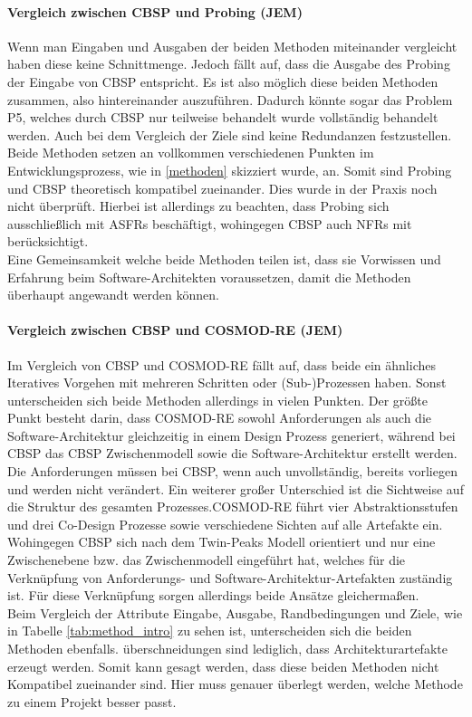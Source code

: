\paragraph{Vergleich zwischen CBSP und Probing (JEM)}
Wenn man Eingaben und Ausgaben der beiden Methoden miteinander vergleicht haben diese keine Schnittmenge. Jedoch f\"allt auf, dass die Ausgabe des Probing der Eingabe von CBSP entspricht. Es ist also m\"oglich diese beiden Methoden zusammen, also hintereinander auszuf\"uhren. Dadurch k\"onnte sogar das Problem P5, welches durch CBSP nur teilweise behandelt wurde vollst\"andig behandelt werden. Auch bei dem Vergleich der Ziele sind keine Redundanzen festzustellen. Beide Methoden setzen an vollkommen verschiedenen Punkten im Entwicklungsprozess, wie in \ref{methoden} skizziert wurde, an. Somit sind Probing und CBSP theoretisch kompatibel zueinander. Dies wurde in der Praxis noch nicht \"uberpr\"uft. Hierbei ist allerdings zu beachten, dass Probing sich ausschlie\ss{}lich mit ASFRs besch\"aftigt, wohingegen CBSP auch NFRs mit ber\"ucksichtigt. \\ 
Eine Gemeinsamkeit welche beide Methoden teilen ist, dass sie Vorwissen und Erfahrung beim Software-Architekten voraussetzen, damit die Methoden \"uberhaupt angewandt werden k\"onnen. \\

\paragraph{Vergleich zwischen CBSP und COSMOD-RE (JEM)}
Im Vergleich von CBSP und COSMOD-RE f\"allt auf, dass beide ein \"ahnliches Iteratives Vorgehen mit mehreren Schritten oder (Sub-)Prozessen haben. Sonst unterscheiden sich beide Methoden allerdings in vielen Punkten. Der gr\"o\ss{}te Punkt besteht darin, dass COSMOD-RE sowohl Anforderungen als auch die Software-Architektur gleichzeitig in einem Design Prozess generiert, w\"ahrend bei CBSP das CBSP Zwischenmodell sowie die Software-Architektur erstellt werden. Die Anforderungen m\"ussen bei CBSP, wenn auch unvollst\"andig, bereits vorliegen und werden nicht ver\"andert. Ein weiterer gro\ss{}er Unterschied ist die Sichtweise auf die Struktur des gesamten Prozesses.COSMOD-RE f\"uhrt vier Abstraktionsstufen und drei Co-Design Prozesse sowie verschiedene Sichten auf alle Artefakte ein. Wohingegen CBSP sich nach dem Twin-Peaks Modell orientiert und nur eine Zwischenebene bzw. das Zwischenmodell eingef\"uhrt hat, welches f\"ur die Verkn\"upfung von Anforderungs- und Software-Architektur-Artefakten zust\"andig ist. F\"ur diese Verkn\"upfung sorgen allerdings beide Ans\"atze gleicherma\ss{}en. \\
Beim Vergleich der Attribute Eingabe, Ausgabe, Randbedingungen und Ziele, wie in Tabelle \ref{tab:method_intro} zu sehen ist, unterscheiden sich die beiden Methoden ebenfalls. \"uberschneidungen sind lediglich, dass Architekturartefakte erzeugt werden. Somit kann gesagt werden, dass diese beiden Methoden nicht Kompatibel zueinander sind. Hier muss genauer \"uberlegt werden, welche Methode zu einem Projekt besser passt. \\

